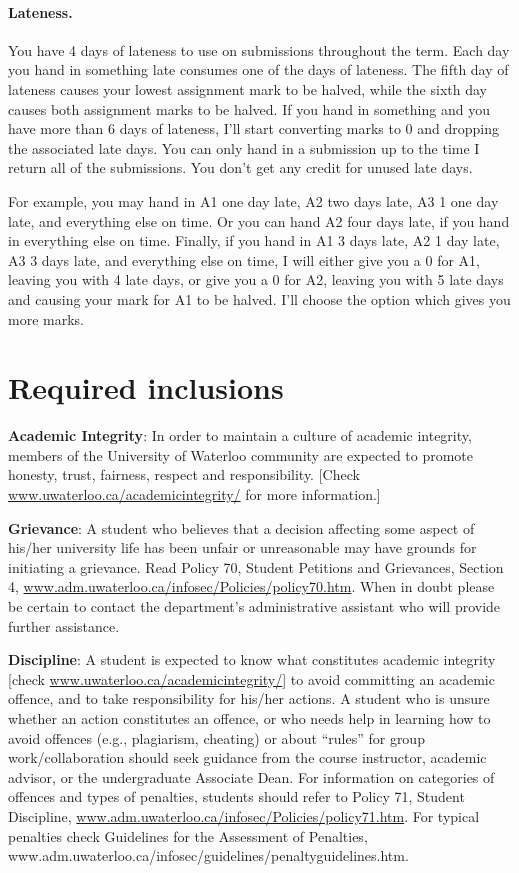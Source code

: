 \documentclass{article}
\begin{document}
\paragraph{Lateness.} You have 4 days of lateness to use on 
submissions throughout the term. Each day you hand in something late
consumes one of the days of lateness. The fifth day of lateness causes
your lowest assignment mark to be halved, while the sixth day causes
both assignment marks to be halved. If you hand in something and you
have more than 6 days of lateness, I'll start converting marks to 0
and dropping the associated late days. You can only hand in a
submission up to the time I return all of the submissions. You don't
get any credit for unused late days.

For example, you may hand in A1 one day late, A2 two days late, A3 1
one day late, and everything else on time.  Or you can hand A2 four
days late, if you hand in everything else on time. Finally, if you
hand in A1 3 days late, A2 1 day late, A3 3 days late, and
everything else on time, I will either give you a 0 for A1, leaving you
with 4 late days, or give you a 0 for A2, leaving you with 5 late days
and causing your mark for A1 to be halved. I'll choose the option
which gives you more marks.

\newpage
\section*{Required inclusions}
{\bf Academic Integrity}: In order to maintain a culture of academic
integrity, members of the University of Waterloo community are
expected to promote honesty, trust, fairness, respect and
responsibility. [Check \url{www.uwaterloo.ca/academicintegrity/} for more
  information.]

\vspace*{1em}\noindent
{\bf Grievance}: A student who believes that a decision affecting some
aspect of his/her university life has been unfair or unreasonable may
have grounds for initiating a grievance. Read Policy 70, Student
Petitions and Grievances, Section 4,
\url{www.adm.uwaterloo.ca/infosec/Policies/policy70.htm}.  When in doubt
please be certain to contact the department’s administrative assistant
who will provide further assistance.

\vspace*{1em}\noindent
{\bf Discipline}: A student is expected to know what constitutes academic
integrity [check \url{www.uwaterloo.ca/academicintegrity/}] to avoid
committing an academic offence, and to take responsibility for his/her
actions. A student who is unsure whether an action constitutes an
offence, or who needs help in learning how to avoid offences (e.g.,
plagiarism, cheating) or about “rules” for group work/collaboration
should seek guidance from the course instructor, academic advisor, or
the undergraduate Associate Dean. For information on categories of
offences and types of penalties, students should refer to Policy 71,
Student Discipline,
\url{www.adm.uwaterloo.ca/infosec/Policies/policy71.htm}. For typical
penalties check Guidelines for the Assessment of Penalties,
www.adm.uwaterloo.ca/infosec/guidelines/penaltyguidelines.htm.
\end{document}
